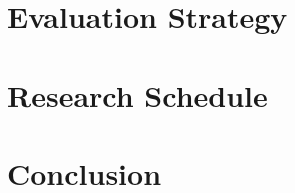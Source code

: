 \documentclass[11pt]{article}
\begin{document}
\section{Evaluation Strategy}
\label{sec:evaluate}


\section{Research Schedule}
\label{sec:schedule}


\section{Conclusion}
\label{sec:conclusion}




\end{document}
